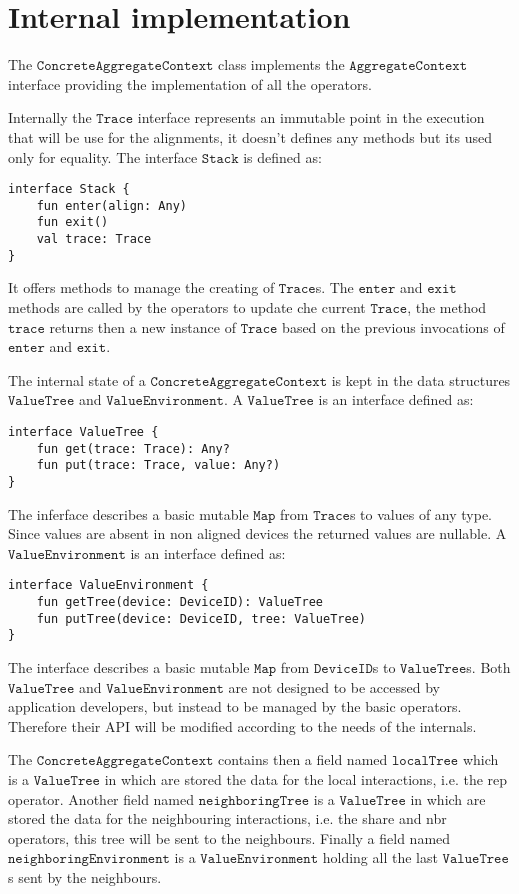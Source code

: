 \section{Internal implementation}
The $\mathtt{ConcreteAggregateContext}$ class implements the $\mathtt{AggregateContext}$ interface providing the implementation of all the operators. 

Internally the $\mathtt{Trace}$ interface represents an immutable point in the execution that will be use for the alignments,  it doesn't defines any methods but its used only for equality. The interface $\mathtt{Stack}$ is defined as:
\begin{lstlisting}[language={kotac}]
interface Stack {
    fun enter(align: Any)
    fun exit()
    val trace: Trace
}
\end{lstlisting}
It offers methods to manage the creating of $\mathtt{Trace}$s. The $\mathtt{enter}$ and $\mathtt{exit}$ methods are called by the operators to update che current $\mathtt{Trace}$, the method $\mathtt{trace}$ returns then a new instance of $\mathtt{Trace}$ based on the previous invocations of $\mathtt{enter}$ and $\mathtt{exit}$.

The internal state of a $\mathtt{ConcreteAggregateContext}$ is kept in the data structures $\mathtt{ValueTree}$ and $\mathtt{ValueEnvironment}$. A $\mathtt{ValueTree}$ is an interface defined as:
\begin{lstlisting}[language={kotac}]
interface ValueTree {
    fun get(trace: Trace): Any?
    fun put(trace: Trace, value: Any?)
}
\end{lstlisting}
The inferface describes a basic mutable $\mathtt{Map}$ from $\mathtt{Trace}$s to values of any type. Since values are absent in non aligned devices the returned values are nullable.
A $\mathtt{ValueEnvironment}$ is an interface defined as:
\begin{lstlisting}[language={kotac}]
interface ValueEnvironment {
    fun getTree(device: DeviceID): ValueTree
    fun putTree(device: DeviceID, tree: ValueTree)
}
\end{lstlisting}
The interface describes a basic mutable $\mathtt{Map}$ from $\mathtt{DeviceID}$s to $\mathtt{ValueTree}$s.
Both $\mathtt{ValueTree}$ and $\mathtt{ValueEnvironment}$ are not designed to be accessed by application developers, but instead to be managed by the basic operators. Therefore their API will be modified according to the needs of the internals.

The $\mathtt{ConcreteAggregateContext}$ contains then a field named $\mathtt{localTree}$ which is a $\mathtt{ValueTree}$ in which are stored the data for the local interactions, i.e. the rep operator. Another field named $\mathtt{neighboringTree}$ is a $\mathtt{ValueTree}$ in which are stored the data for the neighbouring interactions, i.e. the share and nbr operators, this tree will be sent to the neighbours. Finally a field named $\mathtt{neighboringEnvironment}$ is a $\mathtt{ValueEnvironment}$ holding all the last $\mathtt{ValueTree}$s sent by the neighbours.

